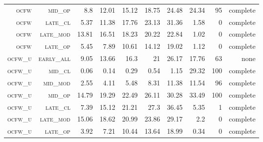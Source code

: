 \begin{landscape}
\begin{table}[!htbp]
\begin{tabular}{@{}rrrrrrr|rrr@{}}
 \textsc{ocfw}        &  \textsc{mid\_op   }      &  8.8            &  12.01            &  15.12     &  18.75           &  24.48      &  24.34    &  95    &  complete       \\
 \textsc{ocfw}        &  \textsc{late\_cl  }      &  5.37           &  11.38            &  17.76     &  23.13           &  31.36      &  1.58     &  0     &  complete      \\
 \textsc{ocfw}        &  \textsc{late\_mod }      &  13.81          &  16.51            &  18.23     &  20.22           &  22.84      &  1.02     &  0     &  complete      \\
 \textsc{ocfw}        &  \textsc{late\_op  }      &  5.45           &  7.89             &  10.61     &  14.12           &  19.02      &  1.12     &  0     &  complete      \\
 \textsc{ocfw\_u}     &  \textsc{early\_all}      &  9.05           &  13.66            &  16.3      &  21              &  26.17      &  17.76    &  63    &  none       \\
 \textsc{ocfw\_u}     &  \textsc{mid\_cl   }      &  0.06           &  0.14             &  0.29      &  0.54            &  1.15       &  29.32    &  100   &  complete      \\
 \textsc{ocfw\_u}     &  \textsc{mid\_mod  }      &  2.55           &  4.11             &  5.48      &  8.31            &  11.38      &  11.54    &  96    &  complete       \\
 \textsc{ocfw\_u}     &  \textsc{mid\_op   }      &  14.79          &  19.29            &  22.49     &  26.11           &  30.28      &  33.49    &  100   &  complete      \\
 \textsc{ocfw\_u}     &  \textsc{late\_cl  }      &  7.39           &  15.12            &  21.21     &  27.3            &  36.45      &  5.35     &  1     &  complete      \\
 \textsc{ocfw\_u}     &  \textsc{late\_mod }      &  15.06          &  18.62            &  20.99     &  23.86           &  29.17      &  2.2      &  0     &  complete    \\
 \textsc{ocfw\_u}     &  \textsc{late\_op  }      &  3.92           &  7.21             &  10.44     &  13.64           &  18.99      &  0.34     &  0     &  complete      \\
\end{tabular}
\end{table}
\end{landscape}

